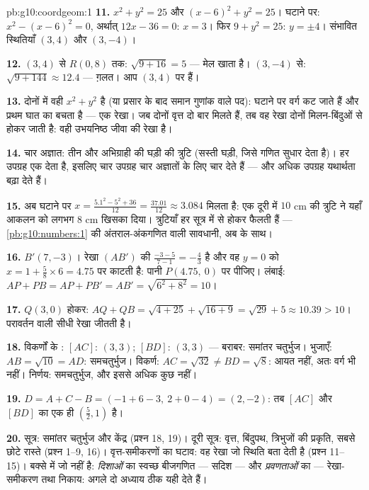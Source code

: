 \begin{solution}{pb:g10:coordgeom:1}
\textbf{11.} $x^2 + y^2 = 25$ और $(x - 6)^2 + y^2 = 25$। घटाने पर: $x^2 - (x - 6)^2 = 0$, अर्थात् $12x - 36 = 0$: $x = 3$। फिर
$9 + y^2 = 25$: $y = \pm 4$। संभावित स्थितियाँ $(3, 4)$ और $(3, -4)$।

\textbf{12.} $(3, 4)$ से $R(0, 8)$ तक: $\sqrt{9 + 16} = 5$ --- मेल खाता है। $(3, -4)$ से: $\sqrt{9 + 144} \approx 12.4$ ---
ग़लत। आप $(3, 4)$ पर हैं।

\textbf{13.} दोनों  में वही $x^2 + y^2$ है (या प्रसार के बाद समान गुणांक
वाले पद): घटाने पर वर्ग कट जाते हैं और प्रथम घात का  बचता है --- एक
रेखा। जब दोनों वृत्त दो बार मिलते हैं, तब वह रेखा दोनों मिलन-बिंदुओं से
होकर जाती है: वही उभयनिष्ठ जीवा की रेखा है।

\textbf{14.} चार अज्ञात: तीन  और अभिग्राही की घड़ी की त्रुटि
(सस्ती घड़ी, जिसे गणित सुधार देता है)। हर उपग्रह एक  देता है, इसलिए
चार उपग्रह चार अज्ञातों के लिए चार  देते हैं --- और अधिक उपग्रह
यथार्थता बढ़ा देते हैं।

\textbf{15.} अब घटाने पर $x = \frac{5.1^2 - 5^2 + 36}{12} = \frac{37.01}{12} \approx
3.084$ मिलता है: एक दूरी में $10$ cm की त्रुटि ने
यहाँ आकलन को लगभग $8$ cm खिसका दिया। त्रुटियाँ हर सूत्र में से होकर फैलती
हैं --- \cref{pb:g10:numbers:1} की अंतराल-अंकगणित वाली सावधानी, अब  के साथ।

\textbf{16.} $B' (7, -3)$। रेखा $(AB')$ की  $\frac{-3 - 5}{7 - 1} = -\frac43$ है और वह $y = 0$ को $x = 1 + \frac{5}{8} \times 6 = 4.75$ पर
काटती है: पानी $P(4.75,\ 0)$ पर पीजिए।  लंबाई: $AP + PB = AP + PB' = AB' =
\sqrt{6^2 + 8^2} = 10$।

\textbf{17.} $Q(3, 0)$ होकर: $AQ + QB = \sqrt{4 + 25} + \sqrt{16 + 9} = \sqrt{29} + 5
\approx 10.39 > 10$। परावर्तन वाली सीधी रेखा जीतती है।

\textbf{18.} विकर्णों के : $[AC]$: $(3, 3)$; $[BD]$: $(3, 3)$ --- बराबर:
समांतर चतुर्भुज। भुजाएँ: $AB = \sqrt{10} = AD$: समचतुर्भुज। विकर्ण: $AC = \sqrt{32} \neq BD = \sqrt{8}$: आयत नहीं, अतः
वर्ग भी नहीं। निर्णय: समचतुर्भुज, और इससे अधिक कुछ नहीं।

\textbf{19.} $D = A + C - B = (-1 + 6 - 3,\ 2 + 0 - 4) =
(2, -2)$: तब $[AC]$ और $[BD]$ का  एक ही $\left(\frac52, 1\right)$ है।

\textbf{20.}  सूत्र: समांतर चतुर्भुज और केंद्र (प्रश्न 18, 19)।
दूरी सूत्र: वृत्त, बिंदुपथ, त्रिभुजों की प्रकृति, सबसे छोटे रास्ते (प्रश्न
1--9, 16)। वृत्त-समीकरणों का घटाव: वह रेखा जो स्थिति बता देती है (प्रश्न
11--15)। बक्से में जो नहीं है: \emph{दिशाओं} का स्वच्छ बीजगणित --- सदिश ---
और \emph{प्रवणताओं} का --- रेखा-समीकरण तथा निकाय: अगले दो अध्याय ठीक यही
देते हैं।
\end{solution}
